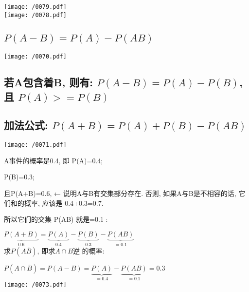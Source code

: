 \documentclass[UTF8]{ctexart}
\begin{document}
	
	\begin{myEnvSample}
		\texttt{[image: /0079.pdf]} \\
		
		\texttt{[image: /0078.pdf]} 
	\end{myEnvSample}
	
	
	
	\subsection{$P(A-B) = P(A) - P(AB)$}	
	\texttt{[image: /0070.pdf]}
	
	
	\subsection{若A包含着B, 则有: $ P(A-B) = P(A) - P(B)$, 且 $P(A) >= P(B) $}
	
	
	\subsection{加法公式: $ P(A+B) = P(A) + P(B) - P(AB)$}	
	\texttt{[image: /0071.pdf]} \\
	
	\begin{myEnvSample}
		A事件的概率是0.4, 即 P(A)=0.4; 
		
		P(B)=0.3; 
		
		且P(A+B)=0.6, ← 说明A与B有交集部分存在. 否则, 如果A与B是不相容的话, 它们和的概率, 应该是 0.4+0.3=0.7.
		
		所以它们的交集 P(AB) 就是=0.1 : 
		
		$
		\underset{0.6}{\underbrace{P\left( A+B \right) }}=\underset{0.4}{\underbrace{P\left( A \right) }}-\underset{0.3}{\underbrace{P\left( B \right) }}-\underset{=0.1}{\underbrace{P\left( AB \right) }}
		$ \\
		
		求$P\left( A\overline{B} \right)$, 即求$A \cap B\text{逆}$ 的概率: 
		
		$
		P\left( A\cap \overline{B} \right) =P\left( A-B \right) =\underset{=0.4}{\underbrace{P\left( A \right) }}-\underset{=0.1}{\underbrace{P\left( AB \right) }}=0.3
		$ \\
		
		\texttt{[image: /0073.pdf]}
		
	\end{myEnvSample}
	
	
	
\end{document}

